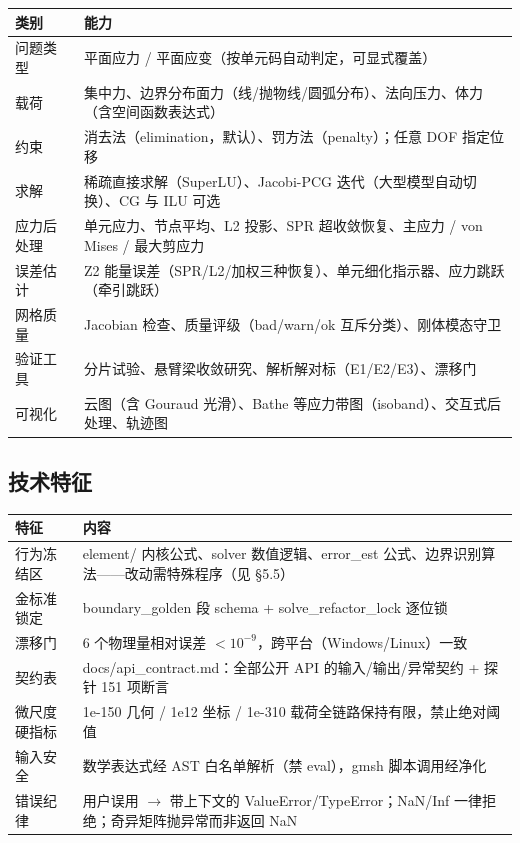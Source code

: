 \documentclass[12pt,a4paper]{ctexart}
\begin{document}
\begin{table}[h]
\centering
\small
\begin{tabular}{p{3.2cm}p{11.5cm}}
\toprule
\textbf{类别} & \textbf{能力} \\
\midrule
问题类型 & 平面应力 / 平面应变（按单元码自动判定，可显式覆盖） \\
载荷 & 集中力、边界分布面力（线/抛物线/圆弧分布）、法向压力、体力（含空间函数表达式） \\
约束 & 消去法（elimination，默认）、罚方法（penalty）；任意 DOF 指定位移 \\
求解 & 稀疏直接求解（SuperLU）、Jacobi-PCG 迭代（大型模型自动切换）、CG 与 ILU 可选 \\
应力后处理 & 单元应力、节点平均、L2 投影、SPR 超收敛恢复、主应力 / von Mises / 最大剪应力 \\
误差估计 & Z2 能量误差（SPR/L2/加权三种恢复）、单元细化指示器、应力跳跃（牵引跳跃） \\
网格质量 & Jacobian 检查、质量评级（bad/warn/ok 互斥分类）、刚体模态守卫 \\
验证工具 & 分片试验、悬臂梁收敛研究、解析解对标（E1/E2/E3）、漂移门 \\
可视化 & 云图（含 Gouraud 光滑）、Bathe 等应力带图（isoband）、交互式后处理、轨迹图 \\
\bottomrule
\end{tabular}
\end{table}

\subsection{技术特征}

\begin{table}[h]
\centering
\small
\begin{tabular}{p{3.2cm}p{11.5cm}}
\toprule
\textbf{特征} & \textbf{内容} \\
\midrule
行为冻结区 & element/ 内核公式、solver 数值逻辑、error\_est 公式、边界识别算法——改动需特殊程序（见 §5.5） \\
金标准锁定 & boundary\_golden 段 schema + solve\_refactor\_lock 逐位锁 \\
漂移门 & 6 个物理量相对误差 $<10^{-9}$，跨平台（Windows/Linux）一致 \\
契约表 & docs/api\_contract.md：全部公开 API 的输入/输出/异常契约 + 探针 151 项断言 \\
微尺度硬指标 & 1e-150 几何 / 1e12 坐标 / 1e-310 载荷全链路保持有限，禁止绝对阈值 \\
输入安全 & 数学表达式经 AST 白名单解析（禁 eval），gmsh 脚本调用经净化 \\
错误纪律 & 用户误用 $\to$ 带上下文的 ValueError/TypeError；NaN/Inf 一律拒绝；奇异矩阵抛异常而非返回 NaN \\
\bottomrule
\end{tabular}
\end{table}
\end{document}
